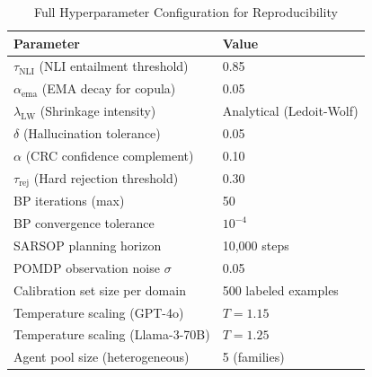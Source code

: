 \documentclass[12pt,a4paper]{report}
\begin{document}
\begin{table}[h]
\centering
\caption{Full Hyperparameter Configuration for Reproducibility}
\label{tab:hyperparams}
\begin{tabular}{ll}
\toprule
Parameter & Value \\
\midrule
$\tau_{\text{NLI}}$ (NLI entailment threshold) & 0.85 \\
$\alpha_{\text{ema}}$ (EMA decay for copula)    & 0.05 \\
$\lambda_{\text{LW}}$ (Shrinkage intensity)     & Analytical (Ledoit-Wolf) \\
$\delta$ (Hallucination tolerance)              & 0.05 \\
$\alpha$ (CRC confidence complement)            & 0.10 \\
$\tau_{\text{rej}}$ (Hard rejection threshold)  & 0.30 \\
BP iterations (max)                             & 50 \\
BP convergence tolerance                        & $10^{-4}$ \\
SARSOP planning horizon                         & 10,000 steps \\
POMDP observation noise $\sigma$                & 0.05 \\
Calibration set size per domain                 & 500 labeled examples \\
Temperature scaling (GPT-4o)                   & $T = 1.15$ \\
Temperature scaling (Llama-3-70B)              & $T = 1.25$ \\
Agent pool size (heterogeneous)                 & 5 (families) \\
\bottomrule
\end{tabular}
\end{table}
\end{document}
